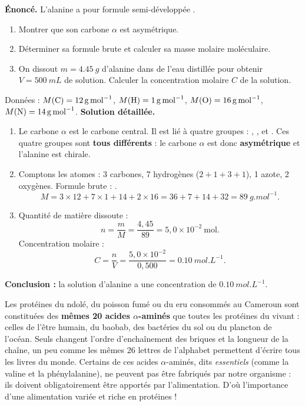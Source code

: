 \documentclass[11pt]{article}
\begin{document}
\begin{exoresolu}
\textbf{Énoncé.} L'alanine a pour formule semi-développée .
\begin{enumerate}
\item Montrer que son carbone $\alpha$ est asymétrique.
\item Déterminer sa formule brute et calculer sa masse molaire moléculaire.
\item On dissout $m = \SI{4,45}{g}$ d'alanine dans de l'eau distillée pour obtenir $V = \SI{500}{mL}$ de solution. Calculer la concentration molaire $C$ de la solution.
\end{enumerate}
Données : $M(\ce{C}) = \SI{12}{g.mol^{-1}}$, $M(\ce{H}) = \SI{1}{g.mol^{-1}}$, $M(\ce{O}) = \SI{16}{g.mol^{-1}}$, $M(\ce{N}) = \SI{14}{g.mol^{-1}}$.
\tcblower
\textbf{Solution détaillée.}
\begin{enumerate}
\item Le carbone $\alpha$ est le carbone central. Il est lié à quatre groupes : , ,  et . Ces quatre groupes sont \textbf{tous différents} : le carbone $\alpha$ est donc \textbf{asymétrique} et l'alanine est chirale.
\item Comptons les atomes : 3 carbones, 7 hydrogènes ($2 + 1 + 3 + 1$), 1 azote, 2 oxygènes. Formule brute : .
\[ M = 3 \times 12 + 7 \times 1 + 14 + 2 \times 16 = 36 + 7 + 14 + 32 = \SI{89}{g.mol^{-1}}. \]
\item Quantité de matière dissoute :
\[ n = \frac{m}{M} = \frac{4,45}{89} = 5,0 \times 10^{-2}~\text{mol}. \]
Concentration molaire :
\[ C = \frac{n}{V} = \frac{5,0 \times 10^{-2}}{0,500} = \SI{0,10}{mol.L^{-1}}. \]
\end{enumerate}
\textbf{Conclusion :} la solution d'alanine a une concentration de $\SI{0,10}{mol.L^{-1}}$.
\end{exoresolu}

\begin{savaistu}
Les protéines du ndolé, du poisson fumé ou du eru consommés au Cameroun sont constituées des \textbf{mêmes 20 acides $\alpha$-aminés} que toutes les protéines du vivant : celles de l'être humain, du baobab, des bactéries du sol ou du plancton de l'océan. Seuls changent l'ordre d'enchaînement des briques et la longueur de la chaîne, un peu comme les mêmes 26 lettres de l'alphabet permettent d'écrire tous les livres du monde. Certains de ces acides $\alpha$-aminés, dits \emph{essentiels} (comme la valine et la phénylalanine), ne peuvent pas être fabriqués par notre organisme : ils doivent obligatoirement être apportés par l'alimentation. D'où l'importance d'une alimentation variée et riche en protéines !
\end{savaistu}
\end{document}
